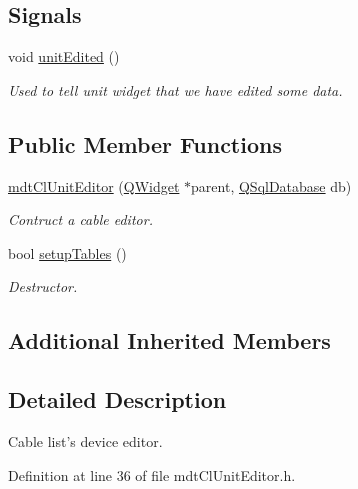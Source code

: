 \subsection*{Signals}
\begin{DoxyCompactItemize}
\item 
void \hyperlink{classmdt_cl_unit_editor_a229445497d158436289db1c87b38009b}{unit\-Edited} ()
\begin{DoxyCompactList}\small\item\em Used to tell unit widget that we have edited some data. \end{DoxyCompactList}\end{DoxyCompactItemize}
\subsection*{Public Member Functions}
\begin{DoxyCompactItemize}
\item 
\hyperlink{classmdt_cl_unit_editor_a996844e2987893ac9958c6832127538e}{mdt\-Cl\-Unit\-Editor} (\hyperlink{class_q_widget}{Q\-Widget} $\ast$parent, \hyperlink{class_q_sql_database}{Q\-Sql\-Database} db)
\begin{DoxyCompactList}\small\item\em Contruct a cable editor. \end{DoxyCompactList}\item 
bool \hyperlink{classmdt_cl_unit_editor_a962cfbdda9400a7cf99ba38eec0a4155}{setup\-Tables} ()
\begin{DoxyCompactList}\small\item\em Destructor. \end{DoxyCompactList}\end{DoxyCompactItemize}
\subsection*{Additional Inherited Members}


\subsection{Detailed Description}
Cable list's device editor. 

Definition at line 36 of file mdt\-Cl\-Unit\-Editor.\-h.



